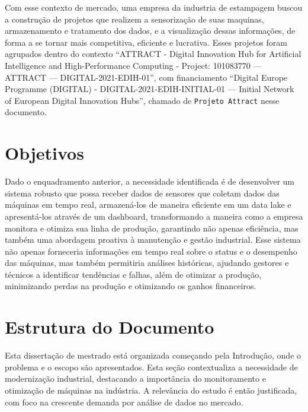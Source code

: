 Com esse contexto de mercado, uma empresa da industria de estampagem buscou a construção de projetos que realizem a sensorização de suas maquinas, armazenamento e tratamento dos dados, e a visualização dessas informações, de forma a se tornar mais competitiva, eficiente e lucrativa. Esses projetos foram agrupados dentro do contexto “ATTRACT - Digital Innovation Hub for Artificial Intelligence and High-Performance Computing - Project: 101083770 — ATTRACT — DIGITAL-2021-EDIH-01”, com financiamento “Digital Europe Programme (DIGITAL) - DIGITAL-2021-EDIH-INITIAL-01 — Initial Network of European Digital Innovation Hubs”, chamado de \texttt{Projeto Attract} nesse documento.

\section{Objetivos}




Dado o enquadramento anterior, a necessidade identificada é de desenvolver um sistema robusto que possa receber dados de sensores que coletam dados das máquinas em tempo real, armazená-los de maneira eficiente em um data lake e apresentá-los através de um dashboard, transformando a maneira como a empresa monitora e otimiza sua linha de produção, garantindo não apenas eficiência, mas também uma abordagem proativa à manutenção e gestão industrial. Esse sistema não apenas forneceria informações em tempo real sobre o status e o desempenho das máquinas, mas também permitiria análises históricas, ajudando gestores e técnicos a identificar tendências e falhas, além de otimizar a produção, minimizando perdas na produção e otimizando os ganhos financeiros.

\section{Estrutura do Documento}
Esta dissertação de mestrado está organizada começando pela Introdução, onde o problema e o escopo são apresentados. Esta seção contextualiza a necessidade de modernização industrial, destacando a importância do monitoramento e otimização de máquinas na indústria. A relevância do estudo é então justificada, com foco na crescente demanda por análise de dados no mercado.

